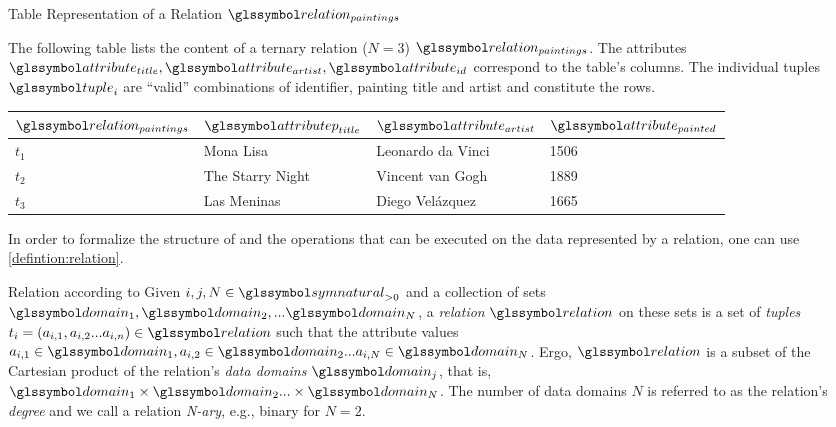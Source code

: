 \begin{example}[label=example:relational_table]{Table Representation of a Relation $\relation_{paintings}$}{}
    
    The following table lists the content of a ternary relation ($N = 3$) $\relation_{paintings}$. The attributes $\attribute_{title}, \attribute_{artist}, \attribute_{id}$ correspond to the table's columns. The individual tuples $\tuple_i$ are ``valid'' combinations of identifier, painting title and artist and constitute the rows.
        
    \begin{center}
        \begin{tabular}{ l || l | l | l |}
            $\relation_{paintings}$ & $\attributep_{title}$  & $\attribute_{artist}$  & $\attribute_{painted}$ \\ 
            \hline
            \hline
            $t_1$ & Mona Lisa &  Leonardo da Vinci & 1506 \\
            \hline
            $t_2$ & The Starry Night & Vincent van Gogh & 1889 \\
            \hline
            $t_3$ & Las Meninas & Diego Velázquez & 1665 \\
            \hline
        \end{tabular}
    \end{center}
\end{example}

In order to formalize the structure of and the operations that can be executed on the data represented by a relation, one can use \cref{defintion:relation}. 

\begin{definition}[label=defintion:relation]{Relation according to \cite{Codd:1970Relational}}{}
    Given $i,j,N \in \symnatural_{> 0}$ and a collection of sets $\domain_1, \domain_2, ... \domain_N$, a \emph{relation} $\relation$ on these sets is a set of \emph{tuples} $t_i = (a_{i,1}, a_{i,2} ... a_{i,n}) \in \relation$ such that the attribute values $a_{i,1} \in \domain_1, a_{i,2} \in \domain_2 ... a_{i,N} \in \domain_N$. Ergo, $\relation$ is a subset of the Cartesian product of the relation's \emph{data domains} $\domain_j$, that is, $\domain_1 \times \domain_2 ... \times \domain_N$. The number of data domains $N$ is referred to as the relation's \emph{degree} and we call a relation \emph{N-ary}, e.g., binary for $N=2$. 
\end{definition}


